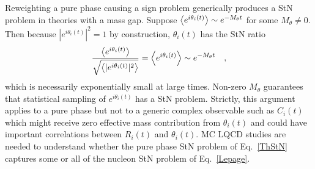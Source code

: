 Reweighting a pure phase causing a sign problem generically produces a StN problem in theories with a mass gap. 
Suppose $\left< e^{i\theta_i(t)} \right>\sim e^{-M_\theta t}$ for some $M_\theta \neq 0$. 
Then because $|e^{i\theta_i(t)}|^2 = 1$ by construction, $\theta_i(t)$ has the StN ratio
%
\begin{equation}
  \begin{split}
    \frac{\left< e^{i\theta_i(t)} \right>}{\sqrt{\left< |e^{i\theta_i(t)}|^2 \right>}} = \left< e^{i\theta_i(t)} \right> \sim e^{-M_\theta t}
    \ \ \ ,
  \end{split}\label{ThStN}
\end{equation}
%
which is necessarily exponentially small at large times. 
Non-zero $M_\theta$ guarantees that statistical sampling of $e^{i\theta_i(t)}$ has a StN problem. 
Strictly, this argument applies to a pure phase but not to a generic complex observable such as 
$C_i(t)$ which might receive zero effective mass contribution from $\theta_i(t)$ and could have important 
correlations between $R_i(t)$ and $\theta_i(t)$. 
MC LQCD studies are needed to understand whether the pure phase StN problem of Eq.~\eqref{ThStN} 
captures some or all of the nucleon StN problem of Eq.~\eqref{Lepage}. 




